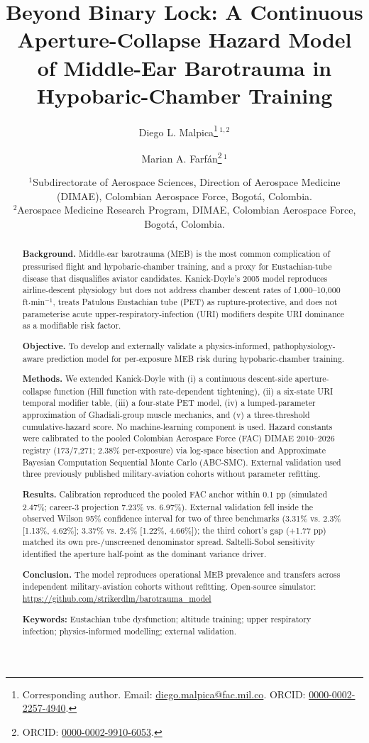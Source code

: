 \documentclass[11pt,a4paper]{article}
\title{Beyond Binary Lock: A Continuous Aperture-Collapse Hazard Model of Middle-Ear Barotrauma in Hypobaric-Chamber Training}
\author{%
  Diego L. Malpica\thanks{Corresponding author. Email: \href{mailto:diego.malpica@fac.mil.co}{diego.malpica@fac.mil.co}. ORCID: \href{https://orcid.org/0000-0002-2257-4940}{0000-0002-2257-4940}.}\,$^{1,2}$
  \and Marian A. Farf\'{a}n\thanks{ORCID: \href{https://orcid.org/0000-0002-9910-6053}{0000-0002-9910-6053}.}\,$^{1}$%
}
\date{%
\small
$^{1}$Subdirectorate of Aerospace Sciences, Direction of Aerospace Medicine (DIMAE), Colombian Aerospace Force, Bogot\'{a}, Colombia.\\[2pt]
$^{2}$Aerospace Medicine Research Program, DIMAE, Colombian Aerospace Force, Bogot\'{a}, Colombia.%
}
\begin{document}
\maketitle

\begin{abstract}
\textbf{Background.} Middle-ear barotrauma (MEB) is the most common complication of pressurised flight and hypobaric-chamber training, and a proxy for Eustachian-tube disease that disqualifies aviator candidates. Kanick-Doyle's 2005 model reproduces airline-descent physiology but does not address chamber descent rates of 1,000--10,000 ft$\cdot$min$^{-1}$, treats Patulous Eustachian tube (PET) as rupture-protective, and does not parameterise acute upper-respiratory-infection (URI) modifiers despite URI dominance as a modifiable risk factor.

\textbf{Objective.} To develop and externally validate a physics-informed, pathophysiology-aware prediction model for per-exposure MEB risk during hypobaric-chamber training.

\textbf{Methods.} We extended Kanick-Doyle with (i) a continuous descent-side aperture-collapse function (Hill function with rate-dependent tightening), (ii) a six-state URI temporal modifier table, (iii) a four-state PET model, (iv) a lumped-parameter approximation of Ghadiali-group muscle mechanics, and (v) a three-threshold cumulative-hazard score. No machine-learning component is used. Hazard constants were calibrated to the pooled Colombian Aerospace Force (FAC) DIMAE 2010--2026 registry (173/7,271; 2.38\% per-exposure) via log-space bisection and Approximate Bayesian Computation Sequential Monte Carlo (ABC-SMC). External validation used three previously published military-aviation cohorts \citep{Morgagni2012,Landolfi2009,Morgagni2010} without parameter refitting.

\textbf{Results.} Calibration reproduced the pooled FAC anchor within 0.1 pp (simulated 2.47\%; career-3 projection 7.23\% vs. 6.97\%). External validation fell inside the observed Wilson 95\% confidence interval for two of three benchmarks (3.31\% vs. 2.3\% [1.13\%, 4.62\%]; 3.37\% vs. 2.4\% [1.22\%, 4.66\%]); the third cohort's gap (+1.77 pp) matched its own pre-/unscreened denominator spread. Saltelli-Sobol sensitivity identified the aperture half-point as the dominant variance driver.

\textbf{Conclusion.} The model reproduces operational MEB prevalence and transfers across independent military-aviation cohorts without refitting. Open-source simulator: \url{https://github.com/strikerdlm/barotrauma_model}

\textbf{Keywords:} Eustachian tube dysfunction; altitude training; upper respiratory infection; physics-informed modelling; external validation.
\end{abstract}
\end{document}
